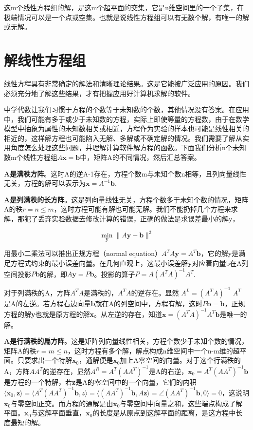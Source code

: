 这m个线性方程组的解，是这m个超平面的交集，它是n维空间里的一个子集，在极端情况可以是一个点或空集。也就是说线性方程组可以有无数个解，有唯一的解或无解。

\section{解线性方程组}

线性方程具有非常确定的解法和清晰理论结果。这是它能被广泛应用的原因。我们必须充分地了解这些结果，才有把握应用好计算机求解的软件。

中学代数让我们习惯于方程的个数等于未知数的个数，其他情况没有答案。在应用中，我们可能有多于或少于未知数的方程，实际上即使等量的方程数，由于在数学模型中抽象为属性的未知数相关或相近，方程作为实验的样本也可能是线性相关的相近的，这样解方程也可能陷入无解、多解或不确定解的情况。我们需要了解从实用角度怎么处理这些问题，并理解计算软件解方程的函数。下面我们分析n个未知数m个线性方程组$ A\mathbf{x}=\mathbf{b} $中，矩阵A的不同情况，然后汇总答案。

\textbf{A是满秩方阵}。这时A的逆A-1存在，方程个数m与未知个数n相等，且列向量线性无关，方程的解可以表示为$ \mathbf{x}=A^{-1}\mathbf{b} $.

\textbf{A是列满秩的长方阵}。这是列向量线性无关，方程个数多于未知个数的情况，矩阵A的秩$ r = n \le m $，这时方程可能有解也可能无解。我们不能扔掉几个方程来求解，那犯了丢弃实验数据去修改计算的错误，正确的做法是求误差最小的解y，

\[\min_\textbf{y}\|A\textbf{y}-\textbf{b}\|^2\]

用最小二乘法可以推出正规方程（normal equation）$ A^TA\mathbf{y}=A^T\mathbf{b} $，它的解y是满足方程式约束的最小误差向量。在几何直观上，这最小误差解$ \mathbf{y} $对应着向量b在A列空间投影$ P\mathbf{b} $的解，即$ A\mathbf{y} = P\mathbf{b} $。投影的算子$ P=A (A^TA)^{-1}A^T $. 

对于列满秩的A，方阵$ A^TA $是满秩的，$ A^TA $的逆存在。显然 $ A^L=(A^TA)^{-1}$  $A^T $ 是A的左逆。若方程右边向量\textbf{b}就在A的列空间中，方程有解，这时$ P\mathbf{b}=\mathbf{b} $，正规方程的解\textbf{y}也就是原方程的解\textbf{x}。从左逆的存在，知道$ \mathbf{x}=(A^TA)^{-1}A^T\mathbf{b} $是唯一的解。

\textbf{A是行满秩的扁方阵}。这是矩阵列向量线性相关，方程个数少于未知个数的情况，矩阵A的秩$ r =m \le n $，这时方程有多个解，解点构成n维空间中一个n-m维的超平面。只要求出一个特解$ \mathbf{x}_0 $，通解便是$ \mathbf{x}_0 $加上A零空间的向量。对于这个行满秩的A，方阵$ AA^T $的逆存在，显然$ A^R=A^T(AA^T)^{-1} $是A的右逆，$ \mathbf{x}_0= A^T(AA^T)^{-1}\mathbf{b} $是方程的一个特解，若\textbf{z}是A的零空间中的一个向量，它们的内积$ \langle \mathbf{x}_0, \mathbf{z}\rangle=\langle A^T(AA^T)^{-1}\mathbf{b}, z\rangle =\langle(AA^T)^{-1}\mathbf{b}, A\mathbf{z}\rangle=\angle(AA^T)^{-1}\mathbf{b}, 0\rangle= 0 $，这说明$ \mathbf{x}_0 $与零空间正交。而方程的通解是由$ \mathbf{x}_0 $与零空间中向量之和，这些端点构成了解平面。$ \mathbf{x}_0 $与这解平面垂直，$ \mathbf{x}_0 $的长度是从原点到这解平面的距离，是这方程中长度最短的解。

